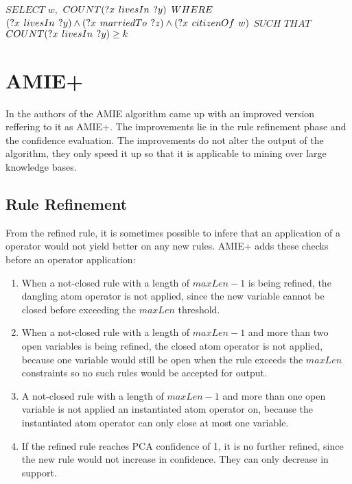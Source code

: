 $SELECT$ $w,$ $COUNT(?x\hspace{0.4em}livesIn\hspace{0.4em}?y)$ $WHERE\\$
$(?x\hspace{0.4em}livesIn\hspace{0.4em}?y) \land (?x\hspace{0.4em}marriedTo\hspace{0.4em}?z) \land (?x\hspace{0.4em}citizenOf\hspace{0.4em}w)\\$
$SUCH$ $THAT$ $COUNT(?x\hspace{0.4em}livesIn\hspace{0.4em}?y)\geq k$

\section{AMIE+}

In \cite{Galarraga2015} the authors of the AMIE algorithm came up with an improved version reffering to it as AMIE+. The improvements lie in the rule refinement phase and the confidence evaluation. The improvements do not alter the output of the algorithm, they only speed it up so that it is applicable to mining over large knowledge bases.

\subsection{Rule Refinement}

From the refined rule, it is sometimes possible to infere that an application of a operator would not yield better on any new rules. AMIE+ adds these checks before an operator application:

\begin{enumerate}
    \item When a not-closed rule with a length of $maxLen - 1$ is being refined, the dangling atom operator is not applied, since the new variable cannot be closed before exceeding the $maxLen$ threshold.
    \item When a not-closed rule with a length of $maxLen - 1$ and more than two open variables is being refined, the closed atom operator is not applied, because one variable would still be open when the rule exceeds the $maxLen$ constraints so no such rules would be accepted for output.
    \item A not-closed rule with a length of $maxLen - 1$ and more than one open variable is not applied an instantiated atom operator on, because the instantiated atom operator can only close at most one variable.
    \item If the refined rule reaches PCA confidence of 1, it is no further refined, since the new rule would not increase in confidence. They can only decrease in support.
\end{enumerate}

